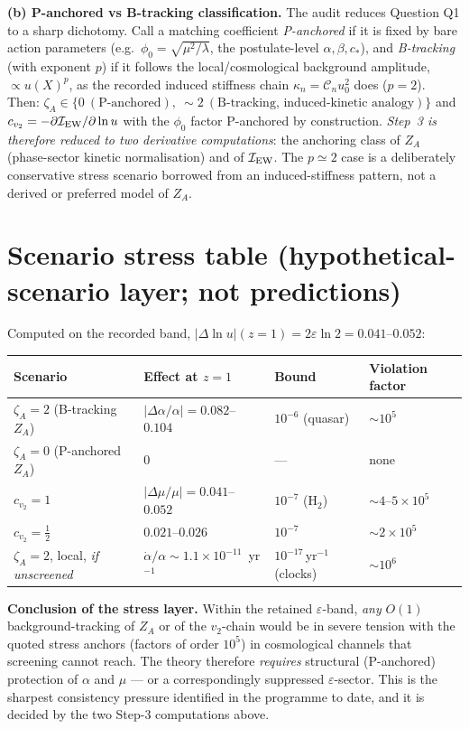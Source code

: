 \documentclass[11pt,a4paper]{article}
\begin{document}
\textbf{(b) P-anchored vs B-tracking classification.} The audit reduces Question Q1
to a sharp dichotomy. Call a matching coefficient \emph{P-anchored} if it is fixed
by bare action parameters (e.g.\ $\phi_0=\sqrt{\mu^2/\lambda}$, the postulate-level
$\alpha,\beta,c_*$), and \emph{B-tracking} (with exponent $p$) if it follows the
local/cosmological background amplitude, $\propto u(X)^p$, as the recorded induced
stiffness chain $\kappa_n=\mathcal C_n u_0^2$ does ($p=2$). Then:
$\zeta_A\in\{0\ (\text{P-anchored}),\ \sim2\ (\text{B-tracking, induced-kinetic
analogy})\}$ and $c_{v_2}=-\partial\mathcal I_{\rm EW}/\partial\ln u$ with the
$\phi_0$ factor P-anchored by construction. \emph{Step~3 is therefore reduced to two
derivative computations}: the anchoring class of $Z_A$ (phase-sector kinetic
normalisation) and of $\mathcal I_{\rm EW}$. The $p\simeq2$ case is a deliberately
conservative stress scenario borrowed from an induced-stiffness pattern, not a
derived or preferred model of $Z_A$.

\section{Scenario stress table (hypothetical-scenario layer; not predictions)}
Computed on the recorded band, $|\Delta\ln u|(z{=}1)=2\varepsilon\ln2
=0.041$--$0.052$:

\renewcommand{\arraystretch}{1.15}\small
\begin{longtable}{@{}p{4.2cm}p{3.4cm}p{3.0cm}p{3.4cm}@{}}
\toprule \textbf{Scenario} & \textbf{Effect at $z=1$} & \textbf{Bound} &
\textbf{Violation factor} \\ \midrule \endhead
\bottomrule \endfoot
$\zeta_A=2$ (B-tracking $Z_A$) & $|\Delta\alpha/\alpha|=0.082$--$0.104$ &
$10^{-6}$ (quasar) & $\sim10^{5}$ \\
$\zeta_A=0$ (P-anchored $Z_A$) & $0$ & --- & none \\
$c_{v_2}=1$ & $|\Delta\mu/\mu|=0.041$--$0.052$ & $10^{-7}$ (H$_2$) &
$\sim4\text{--}5\times10^{5}$ \\
$c_{v_2}=\tfrac12$ & $0.021$--$0.026$ & $10^{-7}$ & $\sim2\times10^{5}$ \\
$\zeta_A=2$, local, \emph{if unscreened} & $\dot\alpha/\alpha\sim1.1\times10^{-11}$
\,yr$^{-1}$ & $10^{-17}$\,yr$^{-1}$ (clocks) & $\sim10^{6}$ \\
\end{longtable}\normalsize

\textbf{Conclusion of the stress layer.} Within the retained $\varepsilon$-band,
\emph{any} $O(1)$ background-tracking of $Z_A$ or of the $v_2$-chain would be in
severe tension with the quoted stress anchors (factors of order $10^{5}$) in
cosmological channels that screening cannot reach. The theory
therefore \emph{requires} structural (P-anchored) protection of $\alpha$ and $\mu$
--- or a correspondingly suppressed $\varepsilon$-sector. This is the sharpest
consistency pressure identified in the programme to date, and it is decided by the
two Step-3 computations above.
\end{document}
